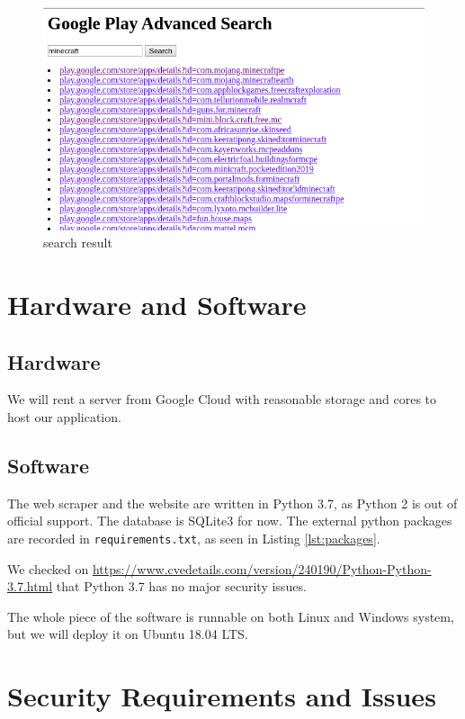 \documentclass[12pt, a4paper]{article}
\def\overleafhome{/tmp}%
\newcommand{\code}[1]{\texttt{#1}}
\begin{document}
\begin{figure}[ht]
\centering
\includegraphics[width=1\textwidth]{homepage.png}
\caption{search result}
\label{fig:search_result}
\end{figure}

\section{Hardware and Software}
\subsection{Hardware}
We will rent a server from Google Cloud with reasonable storage and cores to host our application.

\subsection{Software}
The web scraper and the website are written in Python 3.7, as Python 2 is out of official support. The database is SQLite3 for now. The external python packages are recorded in \code{requirements.txt}, as seen in Listing \ref{lst:packages}.

We checked on \url{https://www.cvedetails.com/version/240190/Python-Python-3.7.html} that Python 3.7 has no major security issues.



The whole piece of the software is runnable on both Linux and Windows system, but we will deploy it on Ubuntu 18.04 LTS.


\section{Security Requirements and Issues}
\end{document}
